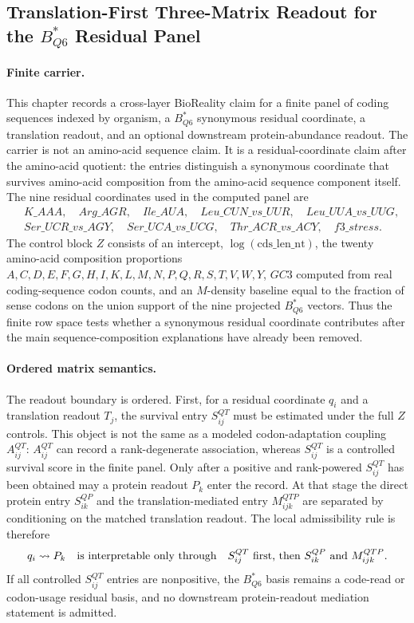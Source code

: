 \subsection{Translation-First Three-Matrix Readout for the $B^*_{Q6}$ Residual Panel}
\label{sec:q6-three-matrix-translation-first-protein-readout-cross-layer}

\paragraph{Finite carrier.}
This chapter records a cross-layer BioReality claim for a finite panel of coding sequences indexed by organism, a $B^*_{Q6}$ synonymous residual coordinate, a translation readout, and an optional downstream protein-abundance readout. The carrier is not an amino-acid sequence claim. It is a residual-coordinate claim after the amino-acid quotient: the entries distinguish a synonymous coordinate that survives amino-acid composition from the amino-acid sequence component itself. The nine residual coordinates used in the computed panel are
$$
\begin{aligned}
&K\_AAA,\quad Arg\_AGR,\quad Ile\_AUA,\quad Leu\_CUN\_vs\_UUR,\quad Leu\_UUA\_vs\_UUG,\\
&Ser\_UCR\_vs\_AGY,\quad Ser\_UCA\_vs\_UCG,\quad Thr\_ACR\_vs\_ACY,\quad f3\_stress.
\end{aligned}
$$
The control block $Z$ consists of an intercept, $\log(\mathrm{cds\_len\_nt})$, the twenty amino-acid composition proportions $A,C,D,E,F,G,H,I,K,L,M,N,P,Q,R,S,T,V,W,Y$, $GC3$ computed from real coding-sequence codon counts, and an $M$-density baseline equal to the fraction of sense codons on the union support of the nine projected $B^*_{Q6}$ vectors. Thus the finite row space tests whether a synonymous residual coordinate contributes after the main sequence-composition explanations have already been removed.

\paragraph{Ordered matrix semantics.}
The readout boundary is ordered. First, for a residual coordinate $q_i$ and a translation readout $T_j$, the survival entry $S^{QT}_{ij}$ must be estimated under the full $Z$ controls. This object is not the same as a modeled codon-adaptation coupling $A^{QT}_{ij}$: $A^{QT}_{ij}$ can record a rank-degenerate association, whereas $S^{QT}_{ij}$ is a controlled survival score in the finite panel. Only after a positive and rank-powered $S^{QT}_{ij}$ has been obtained may a protein readout $P_k$ enter the record. At that stage the direct protein entry $S^{QP}_{ik}$ and the translation-mediated entry $M^{QTP}_{ijk}$ are separated by conditioning on the matched translation readout. The local admissibility rule is therefore
$$
\begin{aligned}
q_i \leadsto P_k\quad \hbox{is interpretable only through}\quad
S^{QT}_{ij}\ \hbox{first, then}\ S^{QP}_{ik}\ \hbox{and}\ M^{QTP}_{ijk}.
\end{aligned}
$$
If all controlled $S^{QT}_{ij}$ entries are nonpositive, the $B^*_{Q6}$ basis remains a code-read or codon-usage residual basis, and no downstream protein-readout mediation statement is admitted.

